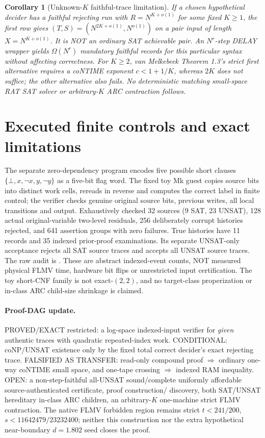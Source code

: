 \documentclass[11pt]{article}
\newtheorem{corollary}[theorem]{Corollary}
\begin{document}
\begin{corollary}[Unknown-$K$ faithful-trace limitation]
If a chosen hypothetical decider has a faithful rejecting run with
$R=N^{K+o(1)}$ for some fixed $K\ge1$, the first row gives
$(T,S)=(N^{2K+o(1)},N^{o(1)})$ on a pair input of length
$X=N^{K+o(1)}$. It is NOT an ordinary SAT achievable pair.
An $N^r$-step DELAY wrapper yields $\Omega(N^r)$ mandatory faithful
records for this particular syntax without affecting correctness.
For $K\ge2$, van Melkebeek Theorem 1.3's strict first alternative
requires a coNTIME exponent $c<1+1/K$, whereas $2K$ does not suffice;
the other alternative also fails. No deterministic matching
small-space RAT SAT solver or arbitrary-$K$ ARC contraction follows.
\end{corollary}

\section{Executed finite controls and exact limitations}
The separate zero-dependency program
encodes five possible short clauses
$\{\bot,x,\neg x,y,\neg y\}$ as a five-bit flag word. The fixed toy
Mk guest copies source bits into distinct work cells, rereads in
reverse and computes the correct label in finite control; the
verifier checks genuine original source bits, previous writes, all
local transitions and output. Exhaustively checked 32 sources
(9 SAT, 23 UNSAT), 128 actual original-variable two-level residuals,
256 deliberately corrupt histories rejected, and 641 assertion groups
with zero failures. True histories have 11 records and 35 indexed
prior-proof examinations. Its separate UNSAT-only acceptance rejects
all SAT source traces and accepts all UNSAT source traces. The raw
audit is
.
These are abstract indexed-event counts, NOT measured physical FLMV
time, hardware bit flips or unrestricted input certification.
The toy short-CNF family is not exact-$(2,2)$, and no target-class
properization or in-class ARC child-size shrinkage is claimed.

\paragraph{Proof-DAG update.} PROVED/EXACT restricted: a log-space
indexed-input verifier for \emph{given} authentic traces with quadratic
repeated-index work. CONDITIONAL: coNP/UNSAT existence only by the fixed
total correct decider's exact rejecting trace. FALSIFIED AS TRANSFER:
read-only compound proof $\Rightarrow$ ordinary one-way coNTIME small
space, and one-tape crossing $\Rightarrow$ indexed RAM inequality.
OPEN: a non-step-faithful all-UNSAT sound/complete uniformly
affordable source-authenticated certificate, proof construction/
discovery, both SAT/UNSAT hereditary in-class ARC children, an
arbitrary-$K$ one-machine strict FLMV contraction. The native
FLMV forbidden region remains strict
$t<241/200$, $s<11642479/23232400$;
neither this construction nor the extra hypothetical near-boundary
$d=1.802$ seed closes the proof.
\end{document}
